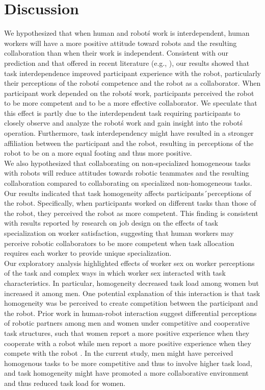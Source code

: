 \section{Discussion}
        We hypothesized that when human and robot\' s work is interdependent, human workers will have a more positive attitude toward robots and the resulting collaboration than when their work is independent. Consistent with our prediction and that offered in recent literature (e.g., \cite{johnson2012autonomy}), our results showed that task interdependence improved participant experience with the robot, particularly their perceptions of the robot\' s competence and the robot as a collaborator. When participant work depended on the robot\' s work, participants perceived the robot to be more competent and to be a more effective collaborator. We speculate that this effect is partly due to the interdependent task requiring participants to closely observe and analyze the robot\' s work and gain insight into the robot\' s operation. Furthermore, task interdependency might have resulted in a stronger affiliation between the participant and the robot, resulting in perceptions of the robot to be on a more equal footing and thus more positive. \\
       We also hypothesized that collaborating on non-specialized homogeneous tasks with robots will reduce attitudes towards robotic teammates and the resulting collaboration compared to collaborating on specialized non-homogeneous tasks. Our results indicated that task homogeneity affects participants\'\  perceptions of the robot. Specifically, when participants worked on different tasks than those of the robot, they perceived the robot as more competent. This finding is consistent with results reported by research on job design on the effects of task specialization on worker satisfaction, suggesting that human workers may perceive robotic collaborators to be more competent when task allocation requires each worker to provide unique specialization.\\
       Our exploratory analysis highlighted effects of worker sex on worker perceptions of the task and complex ways in which worker sex interacted with task characteristics. In particular, homogeneity decreased task load among women but increased it among men. One potential explanation of this interaction is that task homogeneity was be perceived to create competition between the participant and the robot. Prior work in human-robot interaction suggest differential perceptions of robotic partners among men and women under competitive and cooperative task structures, such that women report a more positive experience when they cooperate with a robot while men report a more positive experience when they compete with the robot \cite{mutlu2006task}. In the current study, men might have perceived homogenous tasks to be more competitive and thus to involve higher task load, and task homogeneity might have promoted a more collaborative environment and thus reduced task load for women.\\ 
